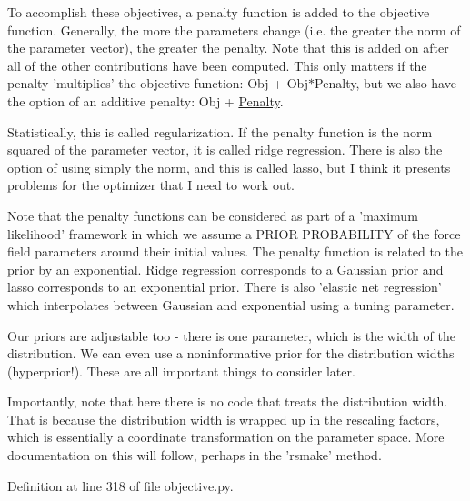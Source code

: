 To accomplish these objectives, a penalty function is added to the objective function. Generally, the more the parameters change (i.\-e. the greater the norm of the parameter vector), the greater the penalty. Note that this is added on after all of the other contributions have been computed. This only matters if the penalty 'multiplies' the objective function\-: Obj + Obj$\ast$\-Penalty, but we also have the option of an additive penalty\-: Obj + \hyperlink{classforcebalance_1_1objective_1_1Penalty}{Penalty}.

Statistically, this is called regularization. If the penalty function is the norm squared of the parameter vector, it is called ridge regression. There is also the option of using simply the norm, and this is called lasso, but I think it presents problems for the optimizer that I need to work out.

Note that the penalty functions can be considered as part of a 'maximum likelihood' framework in which we assume a P\-R\-I\-O\-R P\-R\-O\-B\-A\-B\-I\-L\-I\-T\-Y of the force field parameters around their initial values. The penalty function is related to the prior by an exponential. Ridge regression corresponds to a Gaussian prior and lasso corresponds to an exponential prior. There is also 'elastic net regression' which interpolates between Gaussian and exponential using a tuning parameter.

Our priors are adjustable too -\/ there is one parameter, which is the width of the distribution. We can even use a noninformative prior for the distribution widths (hyperprior!). These are all important things to consider later.

Importantly, note that here there is no code that treats the distribution width. That is because the distribution width is wrapped up in the rescaling factors, which is essentially a coordinate transformation on the parameter space. More documentation on this will follow, perhaps in the 'rsmake' method. 

Definition at line 318 of file objective.\-py.



